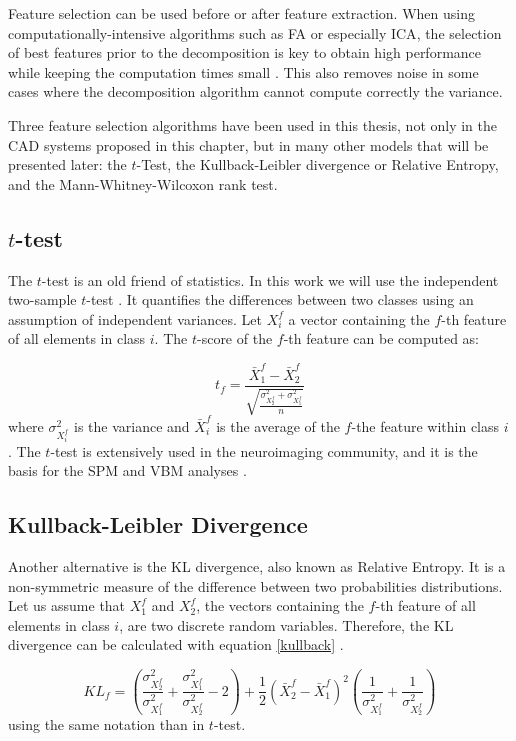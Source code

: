 Feature selection can be used before or after feature extraction. When using computationally-intensive algorithms such as \ac{FA} or especially \ac{ICA}, the selection of best features prior to the decomposition is key to obtain high performance while keeping the computation times small \cite{Martinez201141,Martinez-Murcia20129676}. This also removes noise in some cases where the decomposition algorithm cannot compute correctly the variance. 

Three feature selection algorithms have been used in this thesis, not only in the \ac{CAD} systems proposed in this chapter, but in many other models that will be presented later: the $t$-Test, the Kullback-Leibler divergence or Relative Entropy, and the Mann-Whitney-Wilcoxon rank test. 

\subsection{$t$-test}
The $t$-test is an old friend of statistics. In this work we will use the independent two-sample $t$-test \cite{Fay10}. It quantifies the differences between two classes using an assumption of independent variances. Let $X_i^f$ a vector containing the $f$-th feature of all elements in class $i$. The $t$-score of the $f$-th feature can be computed as:

\begin{equation}
t_f = \frac{\bar{X}_1^f - \bar{X}_2^f}{\sqrt{\frac{\sigma_{X_2^f}^2+\sigma_{X_1^f}^2}{n}}}
\end{equation}
where $\sigma_{X_i^f}^2$ is the variance and $\bar{X}_i^f$ is the average of the $f$-the feature within class $i$. The $t$-test is extensively used in the neuroimaging community, and it is the basis for the \ac{SPM} and \ac{VBM} analyses \cite{spm_book}. 

\subsection{Kullback-Leibler Divergence} 
Another alternative is the \acf{KL} divergence, also known as Relative Entropy. It is a non-symmetric measure of the difference between two probabilities distributions. Let us assume that $X_1^f$ and $X_2^f$, the vectors containing the $f$-th feature of all elements in class $i$, are two discrete random variables. Therefore, the \ac{KL} divergence can be calculated with equation \ref{kullback} \cite{Theodoridis1999}.

\begin{equation}\label{kullback}
KL_f = \left(\frac{\sigma_{X_2^f}^2}{\sigma_{X_1^f}^2} +\frac{\sigma_{X_1^f}^2}{\sigma_{X_2^f}^2} -2 \right) + \frac{1}{2}\left(\bar{X}_2^f-\bar{X}_1^f\right)^2\left(\frac{1}{\sigma_{X_1^f}^2} + \frac{1}{\sigma_{X_2^f}^2}\right)
\end{equation}
using the same notation than in $t$-test. 

